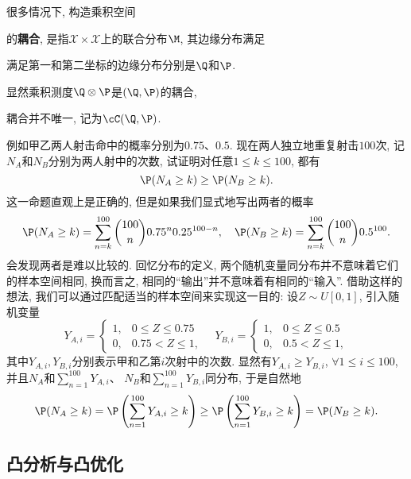 很多情况下, 构造乘积空间

的\textbf{耦合}, 是指$\mathcal{X} \times \mathcal{X}$上的联合分布$\M$, 其边缘分布满足

满足第一和第二坐标的边缘分布分别是$\Q$和$\P$.


显然乘积测度$\Q \otimes \P$是$(\Q, \P)$的耦合, 

耦合并不唯一, 记为$\cC(\Q, \P)$. 

\begin{example}
	例如甲乙两人射击命中的概率分别为$0.75$、$0.5$. 
	现在两人独立地重复射击$100$次, 记$N_A$和$N_B$分别为两人射中的次数, 试证明对任意$1 \leq k \leq 100$, 都有
	\begin{equation*}
		\P(N_A \geq k) \geq \P(N_B \geq k). 
	\end{equation*}
	这一命题直观上是正确的, 但是如果我们显式地写出两者的概率
	\begin{equation*}
		\P(N_A \geq k) = \sum_{n=k}^{100} \binom{100}{n} 0.75^n 0.25^{100 - n}, \quad
		\P(N_B \geq k) = \sum_{n=k}^{100} \binom{100}{n} 0.5^{100}.  
	\end{equation*}
	会发现两者是难以比较的. 
 	回忆分布的定义, 两个随机变量同分布并不意味着它们的样本空间相同, 换而言之, 相同的“输出”并不意味着有相同的“输入”. 
 	借助这样的想法, 我们可以通过匹配适当的样本空间来实现这一目的: 设$Z \sim U[0,1]$, 引入随机变量
 	\begin{equation*}
 		Y_{A,i} = 
 		\begin{cases}
 			1, & 0 \leq Z \leq 0.75 \\ 0, &0.75 < Z \leq 1, 
 		\end{cases}
 		\quad
 		Y_{B,i} = 
 		\begin{cases}
 			1, & 0 \leq Z \leq 0.5 \\ 0, &0.5 < Z \leq 1, 
 		\end{cases}
 	\end{equation*}
 	其中$Y_{A,i}, Y_{B,i}$分别表示甲和乙第$i$次射中的次数. 
 	显然有$Y_{A,i} \geq Y_{B,i}$, $\forall 1 \leq i \leq 100$, 并且$N_A$和$\sum_{n=1}^{100} Y_{A,i}$、 $N_B$和$\sum_{n=1}^{100} Y_{B,i}$同分布, 于是自然地
 	\begin{equation*}
 		\P(N_A \geq k) 
 		= \P\left(\sum_{n=1}^{100} Y_{A,i} \geq k \right)
 		\geq \P\left(\sum_{n=1}^{100} Y_{B,i} \geq k \right) 
 		= \P(N_B \geq k).
 	\end{equation*}
\end{example}


\subsection{凸分析与凸优化}


